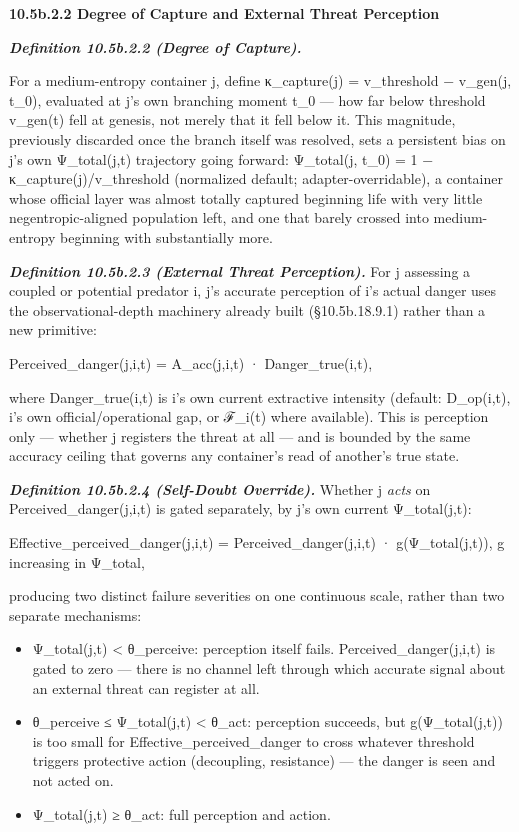 \documentclass[
]{article}
\begin{document}
\textbf{10.5b.2.2 Degree of Capture and External Threat Perception}

\emph{\textbf{Definition 10.5b.2.2 (Degree of Capture).}}

For a medium-entropy container j, define κ\_capture(j) = v\_threshold −
v\_gen(j, t\_0), evaluated at j's own branching moment t\_0 --- how far
below threshold v\_gen(t) fell at genesis, not merely that it fell below
it. This magnitude, previously discarded once the branch itself was
resolved, sets a persistent bias on j's own Ψ\_total(j,t) trajectory
going forward: Ψ\_total(j, t\_0) = 1 − κ\_capture(j)/v\_threshold
(normalized default; adapter-overridable), a container whose official
layer was almost totally captured beginning life with very little
negentropic-aligned population left, and one that barely crossed into
medium-entropy beginning with substantially more.

\emph{\textbf{Definition 10.5b.2.3 (External Threat Perception).}} For j
assessing a coupled or potential predator i, j's accurate perception of
i's actual danger uses the observational-depth machinery already built
(§10.5b.18.9.1) rather than a new primitive:

Perceived\_danger(j,i,t) = A\_acc(j,i,t) · Danger\_true(i,t),

where Danger\_true(i,t) is i's own current extractive intensity
(default: D\_op(i,t), i's own official/operational gap, or ℱ\_i(t) where
available). This is perception only --- whether j registers the threat
at all --- and is bounded by the same accuracy ceiling that governs any
container's read of another's true state.

\emph{\textbf{Definition 10.5b.2.4 (Self-Doubt Override).}} Whether j
\emph{acts} on Perceived\_danger(j,i,t) is gated separately, by j's own
current Ψ\_total(j,t):

Effective\_perceived\_danger(j,i,t) = Perceived\_danger(j,i,t) ·
g(Ψ\_total(j,t)), g increasing in Ψ\_total,

producing two distinct failure severities on one continuous scale,
rather than two separate mechanisms:

\begin{itemize}
\item
  Ψ\_total(j,t) \textless{} θ\_perceive: perception itself fails.
  Perceived\_danger(j,i,t) is gated to zero --- there is no channel left
  through which accurate signal about an external threat can register at
  all.
\item
  θ\_perceive ≤ Ψ\_total(j,t) \textless{} θ\_act: perception succeeds,
  but g(Ψ\_total(j,t)) is too small for Effective\_perceived\_danger to
  cross whatever threshold triggers protective action (decoupling,
  resistance) --- the danger is seen and not acted on.
\item
  Ψ\_total(j,t) ≥ θ\_act: full perception and action.
\end{itemize}
\end{document}
